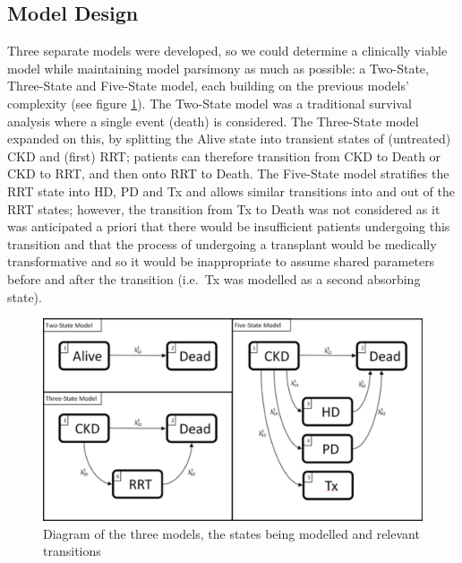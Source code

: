 \documentclass[
]{article}
\begin{document}
\hypertarget{model-design}{%
\subsection{Model Design}\label{model-design}}

Three separate models were developed, so we could determine a clinically viable model while maintaining model parsimony as much as possible: a Two-State, Three-State and Five-State model, each building on the previous models' complexity (see figure \ref{fig:State-Diagram}). The Two-State model was a traditional survival analysis where a single event (death) is considered. The Three-State model expanded on this, by splitting the Alive state into transient states of (untreated) CKD and (first) RRT; patients can therefore transition from CKD to Death or CKD to RRT, and then onto RRT to Death. The Five-State model stratifies the RRT state into HD, PD and Tx and allows similar transitions into and out of the RRT states; however, the transition from Tx to Death was not considered as it was anticipated a priori that there would be insufficient patients undergoing this transition and that the process of undergoing a transplant would be medically transformative and so it would be inappropriate to assume shared parameters before and after the transition (i.e.~Tx was modelled as a second absorbing state).
\begin{figure}

{\centering \includegraphics[width=0.9\linewidth]{figure/Dev_Paper_State_Diagrams} 

}

\caption{Diagram of the three models, the states being modelled and relevant transitions}\label{fig:State-Diagram}
\end{figure}
\end{document}
